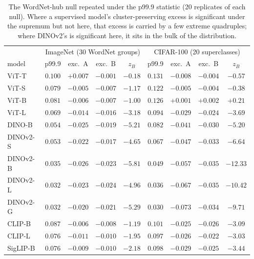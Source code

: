 \begin{table}[H]
\centering
\small
\setlength{\tabcolsep}{4pt}
\begin{tabular}{lcccc|cccc}
\toprule
& \multicolumn{4}{c|}{ImageNet (30 WordNet groups)} & \multicolumn{4}{c}{CIFAR-100 (20 superclasses)} \\
model & p99.9 & exc.\ A & exc.\ B & $z_B$ & p99.9 & exc.\ A & exc.\ B & $z_B$ \\
\midrule
ViT-T & $0.100$ & $+0.007$ & $-0.001$ & $-0.18$ & $0.131$ & $-0.008$ & $-0.004$ & $-0.57$ \\
ViT-S & $0.079$ & $-0.005$ & $-0.007$ & $-1.17$ & $0.122$ & $-0.005$ & $-0.004$ & $-0.38$ \\
ViT-B & $0.081$ & $-0.006$ & $-0.007$ & $-1.00$ & $0.126$ & $+0.001$ & $+0.002$ & $+0.21$ \\
ViT-L & $0.069$ & $-0.014$ & $-0.016$ & $-3.18$ & $0.094$ & $-0.029$ & $-0.024$ & $-3.69$ \\
\midrule
DINO-B & $0.054$ & $-0.025$ & $-0.019$ & $-5.21$ & $0.082$ & $-0.041$ & $-0.030$ & $-5.20$ \\
DINOv2-S & $0.053$ & $-0.022$ & $-0.017$ & $-4.65$ & $0.067$ & $-0.047$ & $-0.033$ & $-6.64$ \\
DINOv2-B & $0.035$ & $-0.026$ & $-0.023$ & $-5.81$ & $0.049$ & $-0.057$ & $-0.035$ & $-12.33$ \\
DINOv2-L & $0.032$ & $-0.023$ & $-0.024$ & $-4.96$ & $0.036$ & $-0.067$ & $-0.035$ & $-10.42$ \\
DINOv2-G & $0.032$ & $-0.020$ & $-0.021$ & $-5.29$ & $0.030$ & $-0.073$ & $-0.034$ & $-9.71$ \\
\midrule
CLIP-B & $0.087$ & $-0.006$ & $-0.008$ & $-1.19$ & $0.101$ & $-0.025$ & $-0.026$ & $-3.09$ \\
CLIP-L & $0.076$ & $-0.011$ & $-0.010$ & $-1.95$ & $0.097$ & $-0.026$ & $-0.022$ & $-3.03$ \\
SigLIP-B & $0.076$ & $-0.009$ & $-0.010$ & $-2.18$ & $0.098$ & $-0.029$ & $-0.025$ & $-3.44$ \\
\bottomrule
\end{tabular}
\caption{The WordNet-hub null repeated under the p99.9 statistic (20 replicates of each null). Where a supervised model's cluster-preserving excess is significant under the supremum but not here, that excess is carried by a few extreme quadruples; where DINOv2's is significant here, it sits in the bulk of the distribution.}
\label{tab:b22-flatnull-p999}
\end{table}
